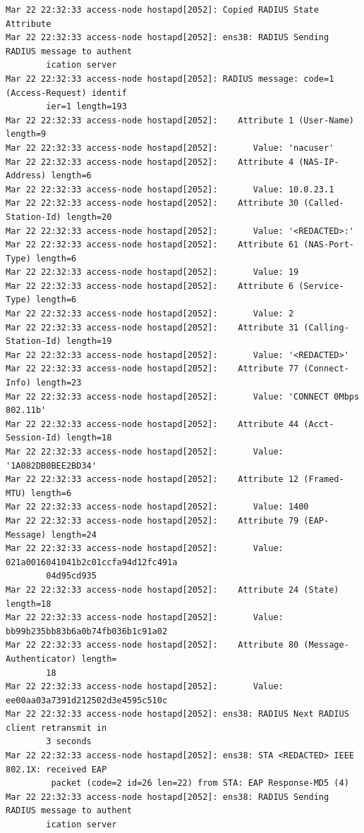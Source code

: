 \documentclass[11pt]{article}
\begin{document}
\begin{verbatim}
Mar 22 22:32:33 access-node hostapd[2052]: Copied RADIUS State Attribute
Mar 22 22:32:33 access-node hostapd[2052]: ens38: RADIUS Sending RADIUS message to authent
        ication server
Mar 22 22:32:33 access-node hostapd[2052]: RADIUS message: code=1 (Access-Request) identif
        ier=1 length=193
Mar 22 22:32:33 access-node hostapd[2052]:    Attribute 1 (User-Name) length=9
Mar 22 22:32:33 access-node hostapd[2052]:       Value: 'nacuser'
Mar 22 22:32:33 access-node hostapd[2052]:    Attribute 4 (NAS-IP-Address) length=6
Mar 22 22:32:33 access-node hostapd[2052]:       Value: 10.0.23.1
Mar 22 22:32:33 access-node hostapd[2052]:    Attribute 30 (Called-Station-Id) length=20
Mar 22 22:32:33 access-node hostapd[2052]:       Value: '<REDACTED>:'
Mar 22 22:32:33 access-node hostapd[2052]:    Attribute 61 (NAS-Port-Type) length=6
Mar 22 22:32:33 access-node hostapd[2052]:       Value: 19
Mar 22 22:32:33 access-node hostapd[2052]:    Attribute 6 (Service-Type) length=6
Mar 22 22:32:33 access-node hostapd[2052]:       Value: 2
Mar 22 22:32:33 access-node hostapd[2052]:    Attribute 31 (Calling-Station-Id) length=19
Mar 22 22:32:33 access-node hostapd[2052]:       Value: '<REDACTED>'
Mar 22 22:32:33 access-node hostapd[2052]:    Attribute 77 (Connect-Info) length=23
Mar 22 22:32:33 access-node hostapd[2052]:       Value: 'CONNECT 0Mbps 802.11b'
Mar 22 22:32:33 access-node hostapd[2052]:    Attribute 44 (Acct-Session-Id) length=18
Mar 22 22:32:33 access-node hostapd[2052]:       Value: '1A082DB0BEE2BD34'
Mar 22 22:32:33 access-node hostapd[2052]:    Attribute 12 (Framed-MTU) length=6
Mar 22 22:32:33 access-node hostapd[2052]:       Value: 1400
Mar 22 22:32:33 access-node hostapd[2052]:    Attribute 79 (EAP-Message) length=24
Mar 22 22:32:33 access-node hostapd[2052]:       Value: 021a0016041041b2c01ccfa94d12fc491a
        04d95cd935
Mar 22 22:32:33 access-node hostapd[2052]:    Attribute 24 (State) length=18
Mar 22 22:32:33 access-node hostapd[2052]:       Value: bb99b235bb83b6a0b74fb036b1c91a02
Mar 22 22:32:33 access-node hostapd[2052]:    Attribute 80 (Message-Authenticator) length=
        18
Mar 22 22:32:33 access-node hostapd[2052]:       Value: ee00aa03a7391d212502d3e4595c510c
Mar 22 22:32:33 access-node hostapd[2052]: ens38: RADIUS Next RADIUS client retransmit in 
        3 seconds
Mar 22 22:32:33 access-node hostapd[2052]: ens38: STA <REDACTED> IEEE 802.1X: received EAP
         packet (code=2 id=26 len=22) from STA: EAP Response-MD5 (4)
Mar 22 22:32:33 access-node hostapd[2052]: ens38: RADIUS Sending RADIUS message to authent
        ication server

\end{verbatim}
\end{document}
